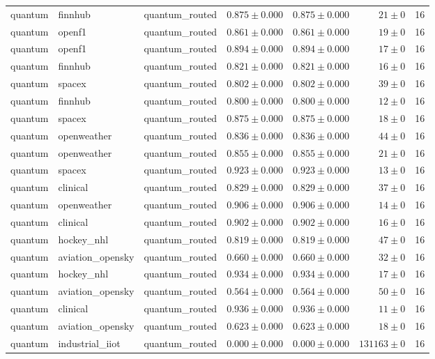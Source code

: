 \begin{table}[htbp]
\begin{tabular}{l l l r r r r}
quantum & finnhub & quantum\_routed & $0.875\pm0.000$ & $0.875\pm0.000$ & $21\pm0$ & 16 \\
quantum & openf1 & quantum\_routed & $0.861\pm0.000$ & $0.861\pm0.000$ & $19\pm0$ & 16 \\
quantum & openf1 & quantum\_routed & $0.894\pm0.000$ & $0.894\pm0.000$ & $17\pm0$ & 16 \\
quantum & finnhub & quantum\_routed & $0.821\pm0.000$ & $0.821\pm0.000$ & $16\pm0$ & 16 \\
quantum & spacex & quantum\_routed & $0.802\pm0.000$ & $0.802\pm0.000$ & $39\pm0$ & 16 \\
quantum & finnhub & quantum\_routed & $0.800\pm0.000$ & $0.800\pm0.000$ & $12\pm0$ & 16 \\
quantum & spacex & quantum\_routed & $0.875\pm0.000$ & $0.875\pm0.000$ & $18\pm0$ & 16 \\
quantum & openweather & quantum\_routed & $0.836\pm0.000$ & $0.836\pm0.000$ & $44\pm0$ & 16 \\
quantum & openweather & quantum\_routed & $0.855\pm0.000$ & $0.855\pm0.000$ & $21\pm0$ & 16 \\
quantum & spacex & quantum\_routed & $0.923\pm0.000$ & $0.923\pm0.000$ & $13\pm0$ & 16 \\
quantum & clinical & quantum\_routed & $0.829\pm0.000$ & $0.829\pm0.000$ & $37\pm0$ & 16 \\
quantum & openweather & quantum\_routed & $0.906\pm0.000$ & $0.906\pm0.000$ & $14\pm0$ & 16 \\
quantum & clinical & quantum\_routed & $0.902\pm0.000$ & $0.902\pm0.000$ & $16\pm0$ & 16 \\
quantum & hockey\_nhl & quantum\_routed & $0.819\pm0.000$ & $0.819\pm0.000$ & $47\pm0$ & 16 \\
quantum & aviation\_opensky & quantum\_routed & $0.660\pm0.000$ & $0.660\pm0.000$ & $32\pm0$ & 16 \\
quantum & hockey\_nhl & quantum\_routed & $0.934\pm0.000$ & $0.934\pm0.000$ & $17\pm0$ & 16 \\
quantum & aviation\_opensky & quantum\_routed & $0.564\pm0.000$ & $0.564\pm0.000$ & $50\pm0$ & 16 \\
quantum & clinical & quantum\_routed & $0.936\pm0.000$ & $0.936\pm0.000$ & $11\pm0$ & 16 \\
quantum & aviation\_opensky & quantum\_routed & $0.623\pm0.000$ & $0.623\pm0.000$ & $18\pm0$ & 16 \\
quantum & industrial\_iiot & quantum\_routed & $0.000\pm0.000$ & $0.000\pm0.000$ & $131163\pm0$ & 16 \\

\end{tabular}
\end{table}
